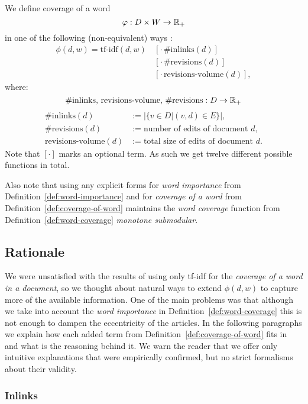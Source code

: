 \begin{definition}
  \label{def:coverage-of-word}
  We define coverage of a word
  \[\varphi : D \times W \to \mathbb{R}_+\]
  in one of the following (non-equivalent) ways :
  \begin{align*}
    \phi(d, w) = \text{tf-idf}(d, w)\, &[\cdot\, \text{\#inlinks}(d)] \\
        &[\cdot\, \text{\#revisions}(d)] \\
        &[\cdot\, \text{revisions-volume}(d)],
  \end{align*}
  where:
  \[\text{\#inlinks, revisions-volume, \#revisions} : D \to \mathbb{R}_+\]
  \begin{align*}
    \text{\#inlinks}(d) &:= |\{v \in D | (v, d) \in E\}|, \\
    \text{\#revisions}(d) &:= \text{number of edits of document } d, \\
    \text{revisions-volume}(d) &:= \text{total size of edits of document } d.
  \end{align*}
  Note that \([\cdot]\) marks an optional term. As such we get twelve different
  possible functions in total.
\end{definition}
Also note that using any explicit forms for \emph{word importance} from
Definition~\ref{def:word-importance} and for \emph{coverage of a word} from
Definition~\ref{def:coverage-of-word} maintains the \emph{word coverage}
function from Definition~\vref{def:word-coverage} \emph{monotone submodular}.

\subsection{Rationale}

We were unsatisfied with the results of using only tf-idf for the
\emph{coverage of a word in a document}, so we thought about natural ways to
extend \(\phi(d, w)\) to capture more of the available information.
One of the main problems was that although we take into account the \emph{word
importance} in Definition~\ref{def:word-coverage} this is not enough to dampen
the eccentricity of the articles.
In the following paragraphs we explain how each added term from
Definition~\ref{def:coverage-of-word} fits in and what is the reasoning behind
it.
We warn the reader that we offer only intuitive explanations that were
empirically confirmed, but no strict formalisms about their validity.

\subsubsection{Inlinks}

